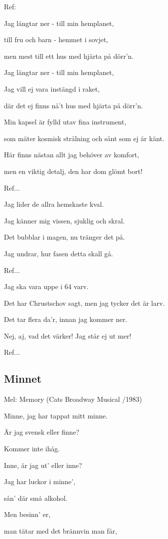Ref:

Jag längtar ner - till min hemplanet,

till fru och barn - hemmet i sovjet,

men mest till ett hus med hjärta på dörr’n.

Jag längtar ner - till min hemplanet,

Jag vill ej vara instängd i raket,

där det ej finns nå’t hus med hjärta på dörr’n. \bigskip

Min kapsel är fylld utav fina instrument,

som mäter kosmisk strålning och sånt som ej är känt.

Här finns nästan allt jag behöver av komfort,

men en viktig detalj, den har dom glömt bort!\bigskip

Ref...\bigskip

Jag lider de allra hemskaste kval.

Jag känner mig vissen, sjuklig och skral.

Det bubblar i magen, nu tränger det på.

Jag undrar, hur fasen detta skall gå.\bigskip

Ref... \bigskip

Jag ska vara uppe i 64 varv.

Det har Chrustschov sagt, men jag tycker det är larv.

Det tar flera da’r, innan jag kommer ner.

Nej, aj, vad det värker! Jag står ej ut mer!\bigskip

Ref... \bigskip



\subsection{\textbf{Minnet}}

Mel: Memory (Cats Broadway Musical /1983)\bigskip

Minne, jag har tappat mitt minne.

Är jag svensk eller finne?

Kommer inte ihåg.

Inne, är jag ut’ eller inne?

Jag har luckor i minne’,

sån’ där små alkohol.

Men besinn’ er,

man tätar med det brännvin man får,

